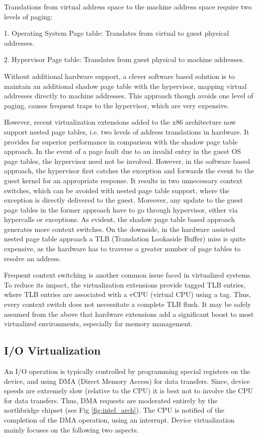 Translations from virtual address space to the machine address space require two levels of paging:

1. Operating System Page table: Translates from virtual to guest physical addresses.

2. Hypervisor Page table: Translates from guest physical to machine addresses.

Without additional hardware support, a clever software based solution is to maintain an additional shadow page table with the hypervisor, mapping virtual addresses directly to machine addresses. This approach though avoids one level of paging, causes frequent traps to the hypervisor, which are very expensive.

However, recent virtualization extensions added to the x86 architecture now support nested page tables, i.e. two levels of address translations in hardware. It provides far superior performance in comparison with the shadow page table approach. In the event of a page fault due to an invalid entry in the guest OS page tables, the hypervisor need not be involved. However, in the software based approach, the hypervisor first catches the exception and forwards the event to the guest kernel for an appropriate response. It results in two unnecessary context switches, which can be avoided with nested page table support, where the exception is directly delivered to the guest. Moreover, any update to the guest page tables in the former approach have to go through hypervisor, either via hypercalls or exceptions. As evident, the shadow page table based approach generates more context switches. On the downside, in the hardware assisted nested page table approach a TLB (Translation Lookaside Buffer) miss is quite expensive, as the hardware has to traverse a greater number of page tables to resolve an address.

Frequent context switching is another common issue faced in virtualized systems. To reduce its impact, the virtualization extensions provide tagged TLB entries, where TLB entries are associated with a vCPU (virtual CPU) using a tag. Thus, every context switch does not necessitate a complete TLB flush. It may be safely assumed from the above that hardware extensions add a significant boost to most virtualized environments, especially for memory management.

\subsection{I/O Virtualization}
An I/O operation is typically controlled by programming special registers on the device, and using DMA (Direct Memory Access) for data transfers. Since, device speeds are extremely slow (relative to the CPU) it is best not to involve the CPU for data transfers. Thus, DMA requests are moderated entirely by the northbridge chipset (see Fig \ref{fig:intel_arch}). The CPU is notified of the completion of the DMA operation, using an interrupt. Device virtualization mainly focuses on the following two aspects.

